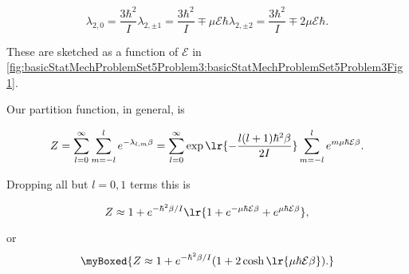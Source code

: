 {\begin{subequations}
\begin{equation}\label{eqn:basicStatMechProblemSet5Problem3:160}
\lambda_{2,0} = \frac{3 \hbar^2}{I} 
\end{equation}
\begin{equation}\label{eqn:basicStatMechProblemSet5Problem3:180}
\lambda_{2,\pm 1} = \frac{3 \hbar^2}{I} \mp \mu \mathcal{E} \hbar
\end{equation}
\begin{equation}\label{eqn:basicStatMechProblemSet5Problem3:200}
\lambda_{2,\pm 2} = \frac{3 \hbar^2}{I} \mp 2 \mu \mathcal{E} \hbar.
\end{equation}
\end{subequations}

These are sketched as a function of $\mathcal{E}$ in \cref{fig:basicStatMechProblemSet5Problem3:basicStatMechProblemSet5Problem3Fig1}.



Our partition function, in general, is

\begin{dmath}\label{eqn:basicStatMechProblemSet5Problem3:220}
Z 
= \sum_{l = 0}^\infty \sum_{m = -l}^l e^{-\lambda_{l,m} \beta}
= \sum_{l = 0}^\infty \exp\lr{ -\frac{l (l+1) \hbar^2 \beta}{2 I}} \sum_{m = -l}^l e^{ m \mu \hbar \mathcal{E} \beta}.
\end{dmath}

Dropping all but $l = 0, 1$ terms this is

\begin{equation}\label{eqn:basicStatMechProblemSet5Problem3:380}
Z 
\approx 
1 + e^{-\hbar^2 \beta/I} 
\lr{ 1 + e^{- \mu \hbar \mathcal{E} \beta } + e^{ \mu \hbar \mathcal{E} \beta}},
\end{equation}

or
\begin{equation}\label{eqn:basicStatMechProblemSet5Problem3:400}
\myBoxed{
Z 
\approx 
1 + e^{-\hbar^2 \beta/I} (
1 + 2 \cosh
\lr{ \mu \hbar \mathcal{E} \beta}
).
}
\end{equation}


}
